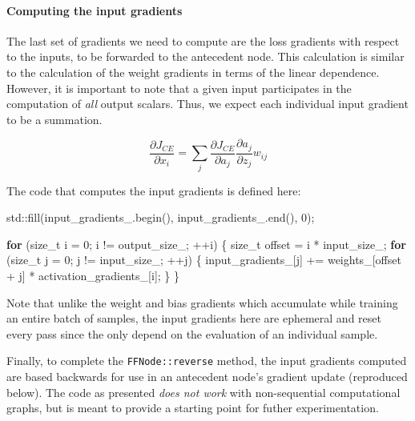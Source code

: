 \documentclass[
]{article}
\newenvironment{Shaded}{}{}
\newcommand{\BuiltInTok}[1]{#1}
\newcommand{\ControlFlowTok}[1]{\textcolor[rgb]{0.00,0.44,0.13}{\textbf{#1}}}
\newcommand{\DataTypeTok}[1]{\textcolor[rgb]{0.56,0.13,0.00}{#1}}
\newcommand{\DecValTok}[1]{\textcolor[rgb]{0.25,0.63,0.44}{#1}}
\newcommand{\NormalTok}[1]{#1}
\newcommand{\VariableTok}[1]{\textcolor[rgb]{0.10,0.09,0.49}{#1}}
\begin{document}
\hypertarget{computing-the-input-gradients}{%
\paragraph{Computing the input
gradients}\label{computing-the-input-gradients}}

The last set of gradients we need to compute are the loss gradients with
respect to the inputs, to be forwarded to the antecedent node. This
calculation is similar to the calculation of the weight gradients in
terms of the linear dependence. However, it is important to note that a
given input participates in the computation of \emph{all} output
scalars. Thus, we expect each individual input gradient to be a
summation.

\[
\frac{\partial J_{CE}}{\partial x_i} = \sum_j \frac{\partial J_{CE}}{\partial a_j}\frac{\partial a_j}{\partial z_j}w_{ij}
\]

The code that computes the input gradients is defined here:

\begin{Shaded}
\begin{Highlighting}[]
    \BuiltInTok{std::}\NormalTok{fill(}\VariableTok{input\_gradients\_}\NormalTok{.begin(), }\VariableTok{input\_gradients\_}\NormalTok{.end(), }\DecValTok{0}\NormalTok{);}

    \ControlFlowTok{for}\NormalTok{ (}\DataTypeTok{size\_t}\NormalTok{ i = }\DecValTok{0}\NormalTok{; i != }\VariableTok{output\_size\_}\NormalTok{; ++i)}
\NormalTok{    \{}
        \DataTypeTok{size\_t}\NormalTok{ offset = i * }\VariableTok{input\_size\_}\NormalTok{;}
        \ControlFlowTok{for}\NormalTok{ (}\DataTypeTok{size\_t}\NormalTok{ j = }\DecValTok{0}\NormalTok{; j != }\VariableTok{input\_size\_}\NormalTok{; ++j)}
\NormalTok{        \{}
            \VariableTok{input\_gradients\_}\NormalTok{[j]}
\NormalTok{                += }\VariableTok{weights\_}\NormalTok{[offset + j] * }\VariableTok{activation\_gradients\_}\NormalTok{[i];}
\NormalTok{        \}}
\NormalTok{    \}}
\end{Highlighting}
\end{Shaded}

Note that unlike the weight and bias gradients which accumulate while
training an entire batch of samples, the input gradients here are
ephemeral and reset every pass since the only depend on the evaluation
of an individual sample.

Finally, to complete the \texttt{FFNode::reverse} method, the input
gradients computed are based backwards for use in an antecedent node's
gradient update (reproduced below). The code as presented \emph{does not
work} with non-sequential computational graphs, but is meant to provide
a starting point for futher experimentation.
\end{document}
